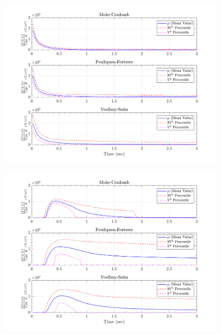 \documentclass{article}
\begin{document}
\begin{figure}[H]
	\begin{minipage}[b]{0.5\linewidth}
    	\centering
    	\includegraphics[width=1\textwidth]{InclinedPlane/LocalRecords/Records/Fb_L1.png}
    	\label{fig:Ramp-L1-Fb}
	\end{minipage}
	\begin{minipage}[b]{0.5\linewidth}
		\centering
		\includegraphics[width=1\textwidth]{InclinedPlane/LocalRecords/Records/Fb_L8.png}
    	\label{fig:Ramp-L2-Fb}
    \end{minipage}


\end{figure}
\end{document}
